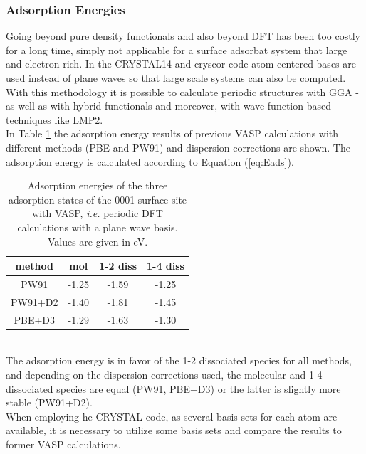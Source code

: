 \documentclass[11pt,DIV=13,BCOR=5mm,a4paper,headinclude]{scrbook}
\begin{document}
\subsubsection{Adsorption Energies}
Going beyond pure density functionals and also beyond DFT has been too costly for a long time, simply not applicable for a surface adsorbat system that large and electron rich.
In the CRYSTAL14\cite{crystal14} and cryscor\cite{cryscor} code atom centered bases are used instead of plane waves so that large scale systems can also be computed.
With this methodology it is possible to calculate periodic structures with GGA - as well as with hybrid functionals and moreover, with wave function-based techniques like LMP2.\\
In Table \ref{tab:vasp-results} the adsorption energy results of previous VASP calculations with different methods (PBE and PW91) and dispersion corrections are shown.
The adsorption energy is calculated according to Equation (\ref{eq:Eads}).
\begin{table}[!h]
  \centering
   \caption{Adsorption energies of the three adsorption states of the 0001 surface site with VASP, \textit{i.e.}
periodic DFT calculations with a plane wave basis.
Values are given in eV.}
  \begin{tabular}{c|ccc}%
  \toprule
  method & mol & 1-2 diss & 1-4 diss\\\midrule %
  PW91   &-1.25 &-1.59 &-1.25 \\%
  PW91+D2&-1.40 &-1.81 &-1.45 \\%
  PBE+D3 &-1.29&-1.63 &-1.30 \\\bottomrule%
  \end{tabular}
  \label{tab:vasp-results}
 \end{table}
\\
The adsorption energy is in favor of the 1-2 dissociated species for all methods, and depending on the dispersion corrections used, the molecular and 1-4 dissociated species are equal (PW91, PBE+D3) or the latter is slightly more stable (PW91+D2).
\\
When employing he CRYSTAL code, as several basis sets for each atom are available, it is necessary to utilize some basis sets and compare the results to former VASP calculations.
\end{document}
